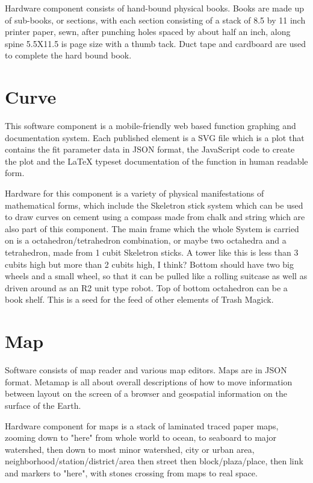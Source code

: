 \documentclass[11pt]{article}
\begin{document}
    Hardware component consists of hand-bound physical books.  Books are made up of sub-books, or sections, with each section consisting of a stack of 8.5 by 11 inch printer paper, sewn, after punching holes spaced by about half an inch, along spine 5.5X11.5 is page size with a thumb tack.  Duct tape and cardboard are used to complete the hard bound book. 



\section{
Curve}



    This software component is a mobile-friendly web based function graphing and documentation system.  Each published element is a SVG file which is a plot that contains the fit parameter data in JSON format, the JavaScript code to create the plot and the LaTeX typeset documentation of the function in human readable form.




    Hardware for this component is a variety of physical manifestations of mathematical forms, which include the Skeletron stick system which can be used to draw curves on cement using a compass made from chalk and string which are also part of this component.  The main frame which the whole System is carried on is a octahedron/tetrahedron combination, or maybe two octahedra and a tetrahedron, made from 1 cubit Skeletron sticks.  A tower like this is less than 3 cubits high but more than 2 cubits high, I think? Bottom should have two big wheels and a small wheel, so that it can be pulled like a rolling suitcase as well as driven around as an R2 unit type robot.  Top of bottom octahedron can be a book shelf.  This is a seed for the feed of other elements of Trash Magick.


\section{
Map}



    Software consists of map reader and various map editors. Maps are in JSON format.  Metamap is all about overall descriptions of how to move information between layout on the screen of a browser and geospatial information on the surface of the Earth.




    Hardware component for maps is a stack of laminated traced paper maps, zooming down to "here" from whole world to ocean, to seaboard to major watershed, then down to most minor watershed, city or urban area, neighborhood/station/district/area then street then block/plaza/place, then link and markers to "here", with stones crossing from maps to real space.
\end{document}
